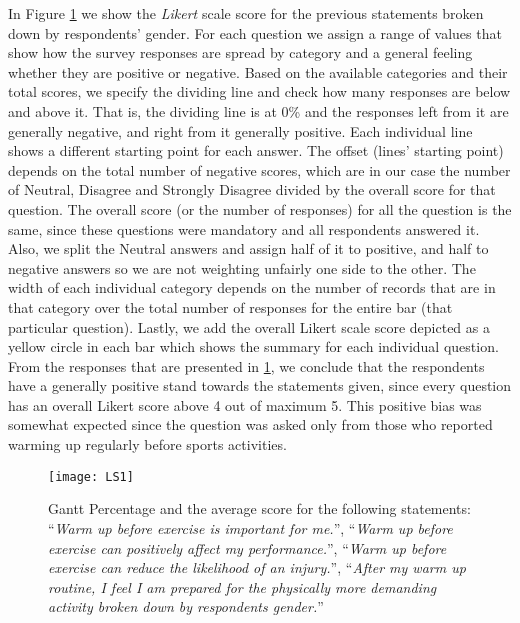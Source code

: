 In Figure \ref{fig:LS1} we show the \textit{Likert} scale score for the previous statements broken down by respondents' gender. For each question we assign a range of values that show how the survey responses are spread by category and a general feeling whether they are positive or negative. Based on the available categories and their total scores, we specify the dividing line and check how many responses are below and above it. That is, the dividing line is at 0\% and the responses left from it are generally negative, and right from it generally positive.  Each individual line shows a different starting point for each answer. The offset (lines' starting point) depends on the total number of negative scores, which are in our case the number of Neutral, Disagree and Strongly Disagree divided by the overall score for that question. The overall score (or the number of responses) for all the question is the same, since these questions were mandatory and all respondents answered it. Also, we split the Neutral answers and assign half of it to positive, and half to negative answers so we are not weighting unfairly one side to the other.  The width of each individual category depends on the number of records that are in that category over the total number of responses for the entire bar (that particular question). Lastly, we add the overall Likert scale score depicted as a yellow circle in each bar which shows the summary for each individual question. From the responses that are presented in \ref{fig:LS1}, we conclude that the respondents have a generally positive stand towards the statements given, since every question has an overall Likert score above 4 out of maximum 5. This positive bias was somewhat expected since the question was asked only from those who reported warming up regularly before sports activities. \pagebreak
\begin{figure}[h]
    \centering
    \texttt{[image: LS1]}
    \caption[Gantt Percentage and the average score for the warm up related statements.]{Gantt Percentage and the average score for the following statements: ``\textit{Warm up before exercise is important for me.}'', ``\textit{Warm up before exercise can positively affect my performance.}'', ``\textit{Warm up before exercise can reduce the likelihood of an injury.}'', ``\textit{After my warm up routine, I feel I am prepared for the physically more demanding activity broken down by respondents gender.}''}
    \label{fig:LS1}
\end{figure}\\
